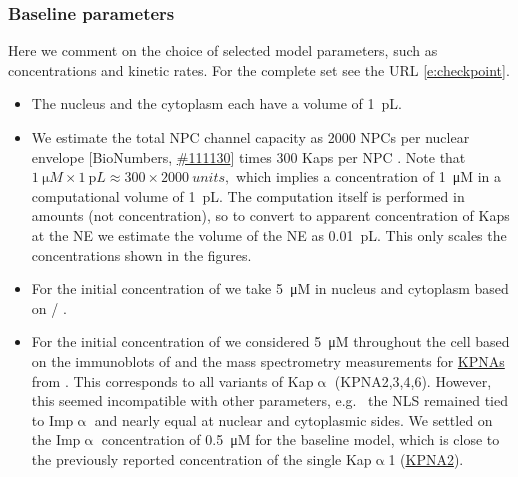 \documentclass[12pt,notitlepage]{article}
\def\[#1\]{\begin{align}#1\end{align}}
\begin{document}
\subsubsection*{Baseline parameters} \label{ss:3s:baseline}

Here we comment on the choice of 
selected
model parameters,
such as concentrations and kinetic rates.
%
%
For the complete set 
see the URL \eqref{e:checkpoint}.

\begin{itemize}

\item

The nucleus and the cytoplasm each have a volume
of \SI{1}{\pico L}.


\item

We estimate the total NPC channel capacity
as 
2000 NPCs per nuclear envelope
[BioNumbers, \href{https://bionumbers.hms.harvard.edu/bionumber.aspx?id=111130}{\#111130}]
times
300 Kaps per NPC
\cite[\href{https://i.ibb.co/8jdLvn1/Paradise-Levin-Korza-Carson-2007-Fig7.jpg}{Fig.~7}]{ParadiseETAL2007}.
%
%
Note that 
$ %
	\SI{1}{\micro M} \times \SI{1}{\pico L} 
	\approx
	300 \times \SI{2000}{units}
	,	
$ %
which implies a concentration of \SI{1}{\micro M}
in a computational volume of \SI{1}{\pico L}.
%
%
%
The computation itself is performed in amounts
(not concentration),
so to convert to apparent concentration
of Kaps at the NE
we estimate
the volume of the NE as \SI{0.01}{\pico L}.
%
This only scales
the concentrations 
shown in the figures.


\item

For the initial concentration of 
we take
\SI{5}{\micro M}
in nucleus and cytoplasm
based on
\cite[\href{https://i.ibb.co/1mNP2XT/Kalita-Kapinos-Lim2021-Fig4.png}{Fig.~4}]{KalitaKapinosLim2021} / 
\cite[\href{https://i.ibb.co/0nLsTZv/Screenshot-from-2022-01-28-15-03-10.png}{Fig.~4a}]{NguyenPappireddiWuhr2019}.
%



\item

For the initial concentration of 
we considered 
\SI{5}{\micro M} throughout the cell
based on
%
the immunoblots of
\cite[\href{https://i.ibb.co/1z0YJ0T/Screenshot-from-2022-01-28-10-49-23.png}{Fig.~7}]{ZienkiewiczETAL2013}
%
and the mass spectrometry measurements for 
\href{https://www.genecards.org/Search/Symbol?queryString=KPNA*}{KPNAs}
from
\cite[Table~S5]{WuhrETAL2014}.
%
This corresponds to all variants of Kap$\upalpha$ (KPNA2,3,4,6).
%
%
However,
this seemed incompatible with other parameters,
e.g.~%
the NLS remained tied to {Imp$\upalpha$}
and nearly equal at nuclear and cytoplasmic sides.
%
%
We settled on the {Imp$\upalpha$} concentration of \SI{0.5}{\micro M}
for the baseline model,
which is close to the previously reported concentration
of the single Kap$\upalpha$1 (\href{https://www.genecards.org/cgi-bin/carddisp.pl?gene=KPNA2}{KPNA2}).


\end{itemize}
\end{document}
